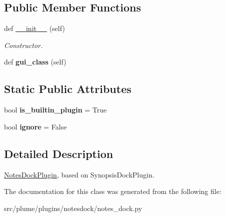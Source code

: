 \subsection*{Public Member Functions}
\begin{DoxyCompactItemize}
\item 
def \hyperlink{classnotes__dock_1_1_notes_dock_plugin_a8de927b9e83d003d5a73322237e5fefc}{\+\_\+\+\_\+init\+\_\+\+\_\+} (self)\hypertarget{classnotes__dock_1_1_notes_dock_plugin_a8de927b9e83d003d5a73322237e5fefc}{}\label{classnotes__dock_1_1_notes_dock_plugin_a8de927b9e83d003d5a73322237e5fefc}

\begin{DoxyCompactList}\small\item\em Constructor. \end{DoxyCompactList}\item 
def {\bfseries gui\+\_\+class} (self)\hypertarget{classnotes__dock_1_1_notes_dock_plugin_ac54856503459caf6b2bdcb9430a4be56}{}\label{classnotes__dock_1_1_notes_dock_plugin_ac54856503459caf6b2bdcb9430a4be56}

\end{DoxyCompactItemize}
\subsection*{Static Public Attributes}
\begin{DoxyCompactItemize}
\item 
bool {\bfseries is\+\_\+builtin\+\_\+plugin} = True\hypertarget{classnotes__dock_1_1_notes_dock_plugin_ac9e7e91a4885ef1ef8a1f9340a28b7fa}{}\label{classnotes__dock_1_1_notes_dock_plugin_ac9e7e91a4885ef1ef8a1f9340a28b7fa}

\item 
bool {\bfseries ignore} = False\hypertarget{classnotes__dock_1_1_notes_dock_plugin_a9f195656da5a77fc1eb4aa0e44a56d30}{}\label{classnotes__dock_1_1_notes_dock_plugin_a9f195656da5a77fc1eb4aa0e44a56d30}

\end{DoxyCompactItemize}


\subsection{Detailed Description}
\hyperlink{classnotes__dock_1_1_notes_dock_plugin}{Notes\+Dock\+Plugin}, based on Synopsis\+Dock\+Plugin. 

The documentation for this class was generated from the following file\+:\begin{DoxyCompactItemize}
\item 
src/plume/plugins/notesdock/notes\+\_\+dock.\+py\end{DoxyCompactItemize}
